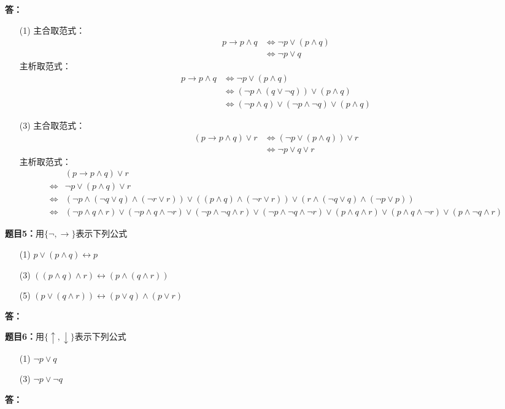 \documentclass[10pt,CCT]{ctexart}
\begin{document}
\vspace{5pt}
\noindent
{\bf 答：}
\begin{enumerate}
\item[(1)] 主合取范式：
\begin{align*}
    p\rightarrow p \wedge q &\Leftrightarrow \neg p \vee(p \wedge q)\\
    &\Leftrightarrow \neg p\vee q
\end{align*}主析取范式：
\begin{align*}
    p\rightarrow p \wedge q &\Leftrightarrow \neg p \vee(p \wedge q)\\
    &\Leftrightarrow (\neg p\wedge(q\vee \neg q))\vee(p\wedge q)\\
    &\Leftrightarrow (\neg p\wedge q)\vee(\neg p\wedge \neg q)\vee(p\wedge q)
\end{align*}
\item[(3)] 主合取范式：
\begin{align*}
    (p\rightarrow p\wedge q)\vee r &\Leftrightarrow (\neg p \vee (p\wedge q))\vee r\\
    &\Leftrightarrow \neg p\vee q \vee r
\end{align*}主析取范式：
\begin{align*}
    &(p\rightarrow p\wedge q)\vee r\\
    \Leftrightarrow &\neg p \vee (p\wedge q)\vee r\\
    \Leftrightarrow &(\neg p\wedge(\neg q\vee q)\wedge(\neg r\vee r))\vee ((p\wedge q)\wedge(\neg r\vee r)) \vee (r\wedge(\neg q\vee q)\wedge(\neg p\vee p))\\
    \Leftrightarrow &(\neg p\wedge q\wedge r)\vee(\neg p\wedge q\wedge \neg r)\vee(\neg p\wedge \neg q\wedge r)\vee(\neg p\wedge \neg q\wedge \neg r)\vee(p\wedge q\wedge r)\vee(p\wedge q\wedge \neg r)\vee(p\wedge \neg q\wedge r)
\end{align*}
\end{enumerate}
\noindent

\vspace{10pt}
\noindent
{\bf 题目5：}用$\{\neg, \rightarrow\}$表示下列公式
\begin{enumerate}
\item[(1)] $p\vee (p\wedge q) \leftrightarrow p$
\item[(3)] $((p\wedge q)\wedge r) \leftrightarrow (p \wedge (q\wedge r))$
\item[(5)] $(p\vee (q \wedge r)) \leftrightarrow (p \vee q) \wedge (p \vee r)$
\end{enumerate}

\vspace{5pt}
\noindent
{\bf 答：}
\noindent


\vspace{10pt}
\noindent
{\bf 题目6：}用$\{\uparrow, \downarrow\}$表示下列公式
\begin{enumerate}
\item[(1)] $\neg p \vee q$
\item[(3)] $\neg p \vee \neg q$
\end{enumerate}

\vspace{5pt}
\noindent
{\bf 答：}
\noindent
\end{document}
